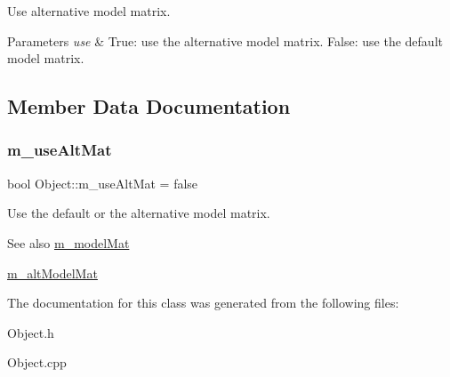 Use alternative model matrix. 


\begin{DoxyParams}{Parameters}
{\em use} & True\+: use the alternative model matrix. False\+: use the default model matrix. \\
\hline
\end{DoxyParams}


\subsection{Member Data Documentation}
\mbox{\label{class_object_ac7370557bcc44f3054712733de22d9ee}} 
\subsubsection{\texorpdfstring{m\+\_\+use\+Alt\+Mat}{m\_useAltMat}}
{\footnotesize\ttfamily bool Object\+::m\+\_\+use\+Alt\+Mat = false\hspace{0.3cm}{\ttfamily [protected]}}



Use the default or the alternative model matrix. 

\begin{DoxySeeAlso}{See also}
\hyperlink{class_object_a63576ab555502bfb8de52e0f75b0d012}{m\+\_\+model\+Mat} 

\hyperlink{class_object_aa8ca8a51906713190326b0b2667d975e}{m\+\_\+alt\+Model\+Mat} 
\end{DoxySeeAlso}


The documentation for this class was generated from the following files\+:\begin{DoxyCompactItemize}
\item 
Object.\+h\item 
Object.\+cpp\end{DoxyCompactItemize}
